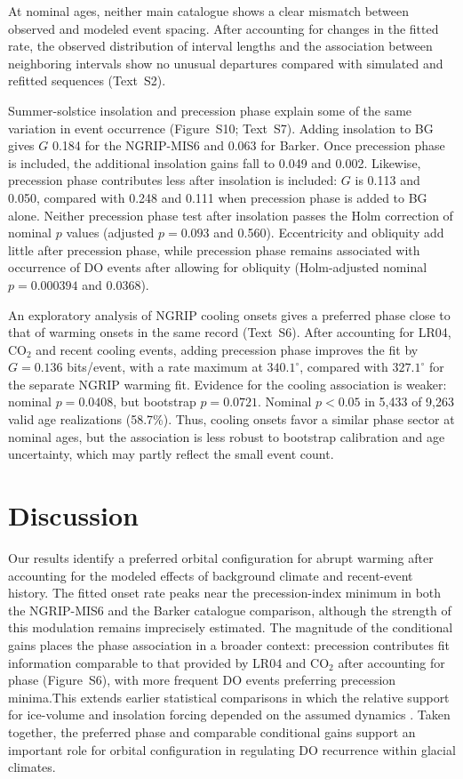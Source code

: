 \documentclass[11pt]{article}
\begin{document}
At nominal ages, neither main catalogue shows a clear mismatch between observed and modeled event spacing. After accounting for changes in the fitted rate, the observed distribution of interval lengths and the association between neighboring intervals show no unusual departures compared with simulated and refitted sequences (Text~S2).

Summer-solstice insolation and precession phase explain some of the same variation in event occurrence (Figure~S10; Text~S7). Adding insolation to BG gives $G$ 0.184 for the NGRIP-MIS6 and 0.063 for Barker. Once precession phase is included, the additional insolation gains fall to 0.049 and 0.002. Likewise, precession phase contributes less after insolation is included: $G$ is 0.113 and 0.050, compared with 0.248 and 0.111 when precession phase is added to BG alone. Neither precession phase test after insolation passes the Holm correction of nominal $p$ values (adjusted $p=0.093$ and 0.560). Eccentricity and obliquity add little after precession phase, while precession phase remains associated with occurrence of DO events after allowing for obliquity (Holm-adjusted nominal $p=0.000394$ and 0.0368).

An exploratory analysis of NGRIP cooling onsets gives a preferred phase close to that of warming onsets in the same record (Text~S6). After accounting for LR04, CO$_2$ and recent cooling events, adding precession phase improves the fit by $G=0.136$ bits/event, with a rate maximum at $340.1^\circ$, compared with $327.1^\circ$ for the separate NGRIP warming fit. Evidence for the cooling association is weaker: nominal $p=0.0408$, but bootstrap $p=0.0721$. Nominal $p<0.05$ in 5,433 of 9,263 valid age realizations (58.7\%). Thus, cooling onsets favor a similar phase sector at nominal ages, but the association is less robust to bootstrap calibration and age uncertainty, which may partly reflect the small event count.

\section{Discussion}

Our results identify a preferred orbital configuration for abrupt warming after accounting for the modeled effects of background climate and recent-event history. The fitted onset rate peaks near the precession-index minimum in both the NGRIP-MIS6 and the Barker catalogue comparison, although the strength of this modulation remains imprecisely estimated. The magnitude of the conditional gains places the phase association in a broader context: precession contributes fit information comparable to that provided by LR04 and CO$_2$ after accounting for phase (Figure~S6), with more frequent DO events preferring precession minima.This extends earlier statistical comparisons in which the relative support for ice-volume and insolation forcing depended on the assumed dynamics \citep{mitsui2017influence}. Taken together, the preferred phase and comparable conditional gains support an important role for orbital configuration in regulating DO recurrence within glacial climates.
\end{document}
